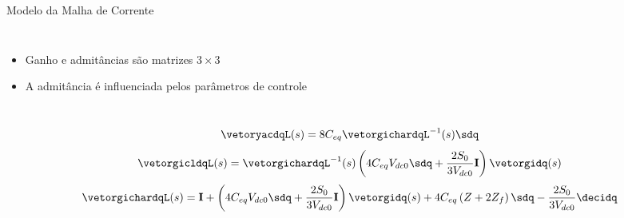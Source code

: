 \begin{frame}{Modelo da Malha de Corrente}
\begin{columns}
\begin{itemize}
	\item Ganho e admitâncias são matrizes $3 \times 3$\\[5pt] 
	\item A admitância é influenciada pelos parâmetros de controle
\end{itemize}



\end{columns}

\vspace*{0.5cm}



\begin{equation*}
\vetoryacdqL(s) = 8 C_{eq} \vetorgichardqL^{-1}(s)\sdq
\end{equation*}
%
%
%
\begin{equation*}
\vetorgicldqL(s) = \vetorgichardqL^{-1}(s) \left(4 C_{eq} V_{dc0} \sdq  +\frac{2 S_0}{3 V_{dc0}} \mathbf{I}\right)\vetorgidq(s)
\end{equation*}
%
\begin{equation*}
\vetorgichardqL(s) = 
\mathbf{I} +
\left(4 C_{eq} V_{dc0} \sdq  +\frac{2 S_0}{3 V_{dc0}} \mathbf{I}\right) \vetorgidq(s)
+ 4 C_{eq}  \left( Z + 2Z_f \right) \sdq
 - \frac{2 S_0}{3 V_{dc0}} \decidq
\end{equation*} 

\end{frame}






